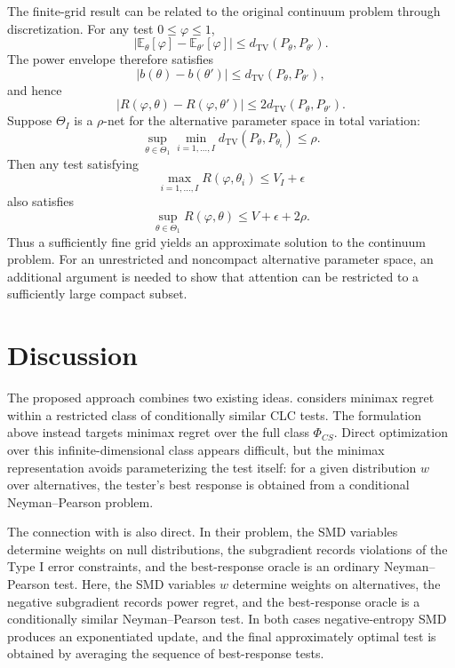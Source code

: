 \documentclass{article}
\theoremstyle{definition}
\theoremstyle{plain}
\theoremstyle{remark}
\begin{document}
The finite-grid result can be related to the original continuum problem through discretization. For any test \(0\leq\varphi\leq1\),
\[\left|\mathbb{E}_{\theta}[\varphi]-\mathbb{E}_{\theta'}[\varphi]\right|\leq d_{\mathrm{TV}}(P_\theta,P_{\theta'}).\]
The power envelope therefore satisfies
\[|b(\theta)-b(\theta')|\leq d_{\mathrm{TV}}(P_\theta,P_{\theta'}),\]
and hence
\[|R(\varphi,\theta)-R(\varphi,\theta')|\leq2d_{\mathrm{TV}}(P_\theta,P_{\theta'}).\]
Suppose \(\Theta_I\) is a \(\rho\)-net for the alternative parameter space in total variation:
\[\sup_{\theta\in\Theta_1}\min_{i=1,\ldots,I}d_{\mathrm{TV}}(P_\theta,P_{\theta_i})\leq\rho.\]
Then any test satisfying
\[\max_{i=1,\ldots,I}R(\varphi,\theta_i)\leq V_I+\epsilon\]
also satisfies
\[\sup_{\theta\in\Theta_1}R(\varphi,\theta)\leq V+\epsilon+2\rho.\]
Thus a sufficiently fine grid yields an approximate solution to the continuum problem. For an unrestricted and noncompact alternative parameter space, an additional argument is needed to show that attention can be restricted to a sufficiently large compact subset.

\section{Discussion}

The proposed approach combines two existing ideas. \cite{andrews2016conditional} considers minimax regret within a restricted class of conditionally similar CLC tests. The formulation above instead targets minimax regret over the full class \(\Phi_{CS}\). Direct optimization over this infinite-dimensional class appears difficult, but the minimax representation avoids parameterizing the test itself: for a given distribution \(w\) over alternatives, the tester's best response is obtained from a conditional Neyman--Pearson problem.

The connection with \cite{aradillas2025approximate} is also direct. In their problem, the SMD variables determine weights on null distributions, the subgradient records violations of the Type I error constraints, and the best-response oracle is an ordinary Neyman--Pearson test. Here, the SMD variables \(w\) determine weights on alternatives, the negative subgradient records power regret, and the best-response oracle is a conditionally similar Neyman--Pearson test. In both cases negative-entropy SMD produces an exponentiated update, and the final approximately optimal test is obtained by averaging the sequence of best-response tests.
\end{document}
